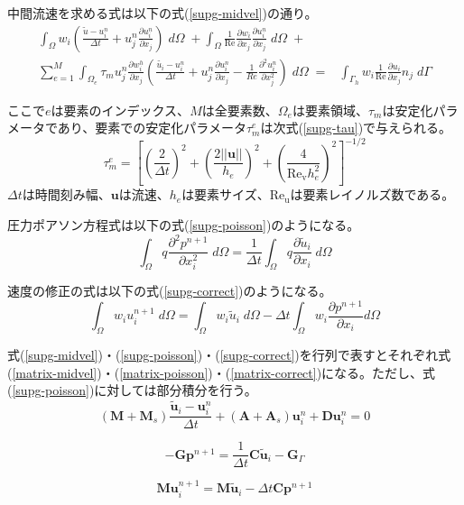 中間流速を求める式は以下の式(\ref{supg-midvel})の通り。
\begin{equation}
\label{supg-midvel}
	\begin{split}
		\int_{\Omega} w_{i}\left( \frac{\tilde{u}-u^{n}_i}{\Delta t} + u^{n}_{j} \frac{\partial u^{n}_{i}}{\partial x_{j}}\right) \; d\Omega \;+ 
		\int_{\Omega} \frac{1}{\mathrm{Re}} \frac{\partial w_{i}}{\partial x_{j}} \frac{\partial u^{n}_{i}}{\partial x_{j}} \; d\Omega \;+& \\
		\sum_{e=1}^{M} \int_{\Omega_{e}} \tau_{m} u_{j}^{n} \frac{\partial w_{i}^{h}}{\partial x_{j}} \left( \frac{\tilde{u_{i}} - u_{i}^{n}}{\Delta t} + u_{j}^{n} \frac{\partial u_{i}^{n}}{\partial x_{j}} - \frac{1}{Re} \frac{\partial^{2} u_{i}^{n}}{\partial x_{j}^{2}}\right) \; d\Omega \;=& 
		\int_{\Gamma_{h}} w_{i}\frac{1}{\mathrm{Re}} \frac{\partial u_{i}}{\partial x_{j}}n_{j} \;d\Gamma
	\end{split}
\end{equation}

ここで$e$は要素のインデックス、$M$は全要素数、$\Omega_{e}$は要素領域、$\tau_{m}$は安定化パラメータであり、要素での安定化パラメータ$\tau_{m}^{e}$は次式(\ref{supg-tau})で与えられる。
\begin{equation}
\label{supg-tau}
	\tau_{m}^{e}=\left[ \left(\frac{2}{\Delta t}\right)^{2} + \left(\frac{2||\bm{u}||}{h_{e}}\right)^{2} + \left(\frac{4}{\mathrm{Re_{v}} h_{e}^{2}}\right)^{2}\right]^{-1/2}
\end{equation}
$\Delta t$は時間刻み幅、$\bm{u}$は流速、$h_e$は要素サイズ、$\mathrm{Re_u}$は要素レイノルズ数である。

圧力ポアソン方程式は以下の式(\ref{supg-poisson})のようになる。
\begin{equation}
\label{supg-poisson}
	\int_{\Omega} q \frac{\partial^{2}p^{n+1}}{\partial x_{i}^{2}} \; d\Omega = 
	\frac{1}{\Delta t} \int_{\Omega} q \frac{\partial \tilde{u}_{i}}{\partial x_{i}} \; d\Omega
\end{equation}

速度の修正の式は以下の式(\ref{supg-correct})のようになる。
\begin{equation}
\label{supg-correct}
	\int_{\Omega} w_{i}u_{i}^{n+1} \; d\Omega = \int_{\Omega} w_{i} \tilde{u}_{i} \; d\Omega
	- \Delta t \int_{\Omega} w_{i} \frac{\partial p^{n+1}}{\partial x_{i}} d\Omega
\end{equation}

式(\ref{supg-midvel})・(\ref{supg-poisson})・(\ref{supg-correct})を行列で表すとそれぞれ式(\ref{matrix-midvel})・(\ref{matrix-poisson})・(\ref{matrix-correct})になる。ただし、式(\ref{supg-poisson})に対しては部分積分を行う。
\begin{equation}
\label{matrix-midvel}
	( \bm{M} + \bm{M}_{s} ) \frac{\tilde{\bm{u}}_i - \bm{u}_{i}^{n}}{\Delta t} + ( \bm{A} + \bm{A}_s ) \bm{u}_{i}^{n} + \bm{D} \bm{u}_{i}^{n} = 0
\end{equation}

\begin{equation}
\label{matrix-poisson}
	-\bm{G} \bm{p}^{n+1} = \frac{1}{\Delta t} \bm{C} \tilde{\bm{u}}_{i} - \bm{G}_{\Gamma}
\end{equation}

\begin{equation}
\label{matrix-correct}
	\bm{M} \bm{u}_{i}^{n+1} = \bm{M} \tilde{\bm{u}}_{i} - \Delta t \bm{C} \bm{p}^{n+1}
\end{equation}